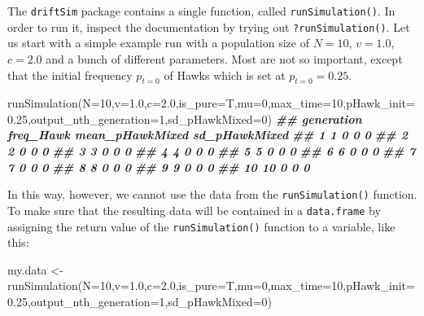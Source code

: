 \documentclass[
]{book}
\newenvironment{Shaded}{\begin{snugshade}}{\end{snugshade}}
\newcommand{\AttributeTok}[1]{\textcolor[rgb]{0.77,0.63,0.00}{#1}}
\newcommand{\DecValTok}[1]{\textcolor[rgb]{0.00,0.00,0.81}{#1}}
\newcommand{\DocumentationTok}[1]{\textcolor[rgb]{0.56,0.35,0.01}{\textbf{\textit{#1}}}}
\newcommand{\FloatTok}[1]{\textcolor[rgb]{0.00,0.00,0.81}{#1}}
\newcommand{\FunctionTok}[1]{\textcolor[rgb]{0.00,0.00,0.00}{#1}}
\newcommand{\NormalTok}[1]{#1}
\newcommand{\OtherTok}[1]{\textcolor[rgb]{0.56,0.35,0.01}{#1}}
\begin{document}
The \texttt{driftSim} package contains a single function, called \texttt{runSimulation()}. In order to run it, inspect the documentation by trying out \texttt{?runSimulation()}. Let us start with a simple example run with a population size of \(N=10\), \(v=1.0\), \(c=2.0\) and a bunch of different parameters. Most are not so important, except that the initial frequency \(p_{t=0}\) of Hawks which is set at \(p_{t=0} = 0.25\).

\begin{Shaded}
\begin{Highlighting}[]
\FunctionTok{runSimulation}\NormalTok{(}\AttributeTok{N=}\DecValTok{10}\NormalTok{,}\AttributeTok{v=}\FloatTok{1.0}\NormalTok{,}\AttributeTok{c=}\FloatTok{2.0}\NormalTok{,}\AttributeTok{is\_pure=}\NormalTok{T,}\AttributeTok{mu=}\DecValTok{0}\NormalTok{,}\AttributeTok{max\_time=}\DecValTok{10}\NormalTok{,}\AttributeTok{pHawk\_init=}\FloatTok{0.25}\NormalTok{,}\AttributeTok{output\_nth\_generation=}\DecValTok{1}\NormalTok{,}\AttributeTok{sd\_pHawkMixed=}\DecValTok{0}\NormalTok{)}
\DocumentationTok{\#\#    generation freq\_Hawk mean\_pHawkMixed sd\_pHawkMixed}
\DocumentationTok{\#\# 1           1         0               0             0}
\DocumentationTok{\#\# 2           2         0               0             0}
\DocumentationTok{\#\# 3           3         0               0             0}
\DocumentationTok{\#\# 4           4         0               0             0}
\DocumentationTok{\#\# 5           5         0               0             0}
\DocumentationTok{\#\# 6           6         0               0             0}
\DocumentationTok{\#\# 7           7         0               0             0}
\DocumentationTok{\#\# 8           8         0               0             0}
\DocumentationTok{\#\# 9           9         0               0             0}
\DocumentationTok{\#\# 10         10         0               0             0}
\end{Highlighting}
\end{Shaded}

In this way, however, we cannot use the data from the \texttt{runSimulation()} function. To make sure that the resulting data will be contained in a \texttt{data.frame} by assigning the return value of the \texttt{runSimulation()} function to a variable, like this:

\begin{Shaded}
\begin{Highlighting}[]
\NormalTok{my.data }\OtherTok{\textless{}{-}} \FunctionTok{runSimulation}\NormalTok{(}\AttributeTok{N=}\DecValTok{10}\NormalTok{,}\AttributeTok{v=}\FloatTok{1.0}\NormalTok{,}\AttributeTok{c=}\FloatTok{2.0}\NormalTok{,}\AttributeTok{is\_pure=}\NormalTok{T,}\AttributeTok{mu=}\DecValTok{0}\NormalTok{,}\AttributeTok{max\_time=}\DecValTok{10}\NormalTok{,}\AttributeTok{pHawk\_init=}\FloatTok{0.25}\NormalTok{,}\AttributeTok{output\_nth\_generation=}\DecValTok{1}\NormalTok{,}\AttributeTok{sd\_pHawkMixed=}\DecValTok{0}\NormalTok{)}
\end{Highlighting}
\end{Shaded}
\end{document}
